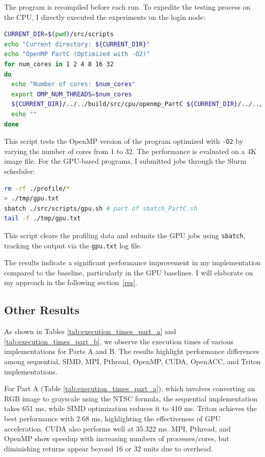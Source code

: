 \documentclass[12pt,a4paper]{report}
\begin{document}
The program is recompiled before each run. To expedite the testing process on the CPU, I directly executed the experiments on the login node:

\begin{lstlisting}[language=bash]
CURRENT_DIR=$(pwd)/src/scripts
echo "Current directory: ${CURRENT_DIR}"
echo "OpenMP PartC (Optimized with -O2)"
for num_cores in 1 2 4 8 16 32
do
  echo "Number of cores: $num_cores"
  export OMP_NUM_THREADS=$num_cores
  ${CURRENT_DIR}/../../build/src/cpu/openmp_PartC ${CURRENT_DIR}/../../images/4K-RGB.jpg ${CURRENT_DIR}/../../images/4K-Bilateral.jpg $num_cores
  echo ""
done
\end{lstlisting}

This script tests the OpenMP version of the program optimized with \texttt{-O2} by varying the number of cores from 1 to 32. The performance is evaluated on a 4K image file.
For the GPU-based programs, I submitted jobs through the Slurm scheduler:

\begin{lstlisting}[language=bash]
rm -rf ./profile/*
> ./tmp/gpu.txt
sbatch ./src/scripts/gpu.sh # part of sbatch_PartC.sh
tail -f ./tmp/gpu.txt
\end{lstlisting}

This script clears the profiling data and submits the GPU jobs using \texttt{sbatch}, tracking the output via the \texttt{gpu.txt} log file. 


The results indicate a significant performance improvement in my implementation compared to the baseline, particularly in the GPU baselines. I will elaborate on my approach in the following section~\ref{res}.

\subsection{Other Results}

As shown in Tables \ref{tab:execution_times_part_a} and \ref{tab:execution_times_part_b}, we observe the execution times of various implementations for Parts A and B. The results highlight performance differences among sequential, SIMD, MPI, Pthread, OpenMP, CUDA, OpenACC, and Triton implementations.

For Part A (Table \ref{tab:execution_times_part_a}), which involves converting an RGB image to grayscale using the NTSC formula, the sequential implementation takes 651 ms, while SIMD optimization reduces it to 410 ms. Triton achieves the best performance with 2.68 ms, highlighting the effectiveness of GPU acceleration. CUDA also performs well at 35.322 ms. MPI, Pthread, and OpenMP show speedup with increasing numbers of processes/cores, but diminishing returns appear beyond 16 or 32 units due to overhead.
\end{document}
